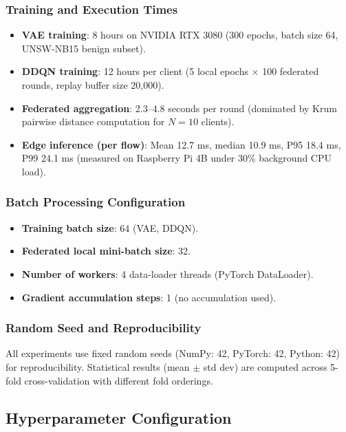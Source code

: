 \documentclass[preprint,12pt]{elsarticle}
\begin{document}
\subsubsection{Training and Execution Times}

\begin{itemize}[leftmargin=1.2em]
    \item \textbf{VAE training}: 8 hours on NVIDIA RTX 3080 (300 epochs, batch size 64, UNSW-NB15 benign subset).
    \item \textbf{DDQN training}: 12 hours per client (5 local epochs $\times$ 100 federated rounds, replay buffer size 20,000).
    \item \textbf{Federated aggregation}: 2.3--4.8 seconds per round (dominated by Krum pairwise distance computation for $N=10$ clients).
    \item \textbf{Edge inference (per flow)}: Mean 12.7 ms, median 10.9 ms, P95 18.4 ms, P99 24.1 ms (measured on Raspberry Pi 4B under 30\% background CPU load).
\end{itemize}

\subsubsection{Batch Processing Configuration}

\begin{itemize}[leftmargin=1.2em]
    \item \textbf{Training batch size}: 64 (VAE, DDQN).
    \item \textbf{Federated local mini-batch size}: 32.
    \item \textbf{Number of workers}: 4 data-loader threads (PyTorch DataLoader).
    \item \textbf{Gradient accumulation steps}: 1 (no accumulation used).
\end{itemize}

\subsubsection{Random Seed and Reproducibility}

All experiments use fixed random seeds (NumPy: 42, PyTorch: 42, Python: 42) for reproducibility. Statistical results (mean $\pm$ std dev) are computed across 5-fold cross-validation with different fold orderings.

\subsection{Hyperparameter Configuration}
\end{document}
